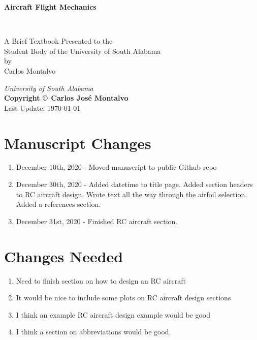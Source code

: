 \documentclass{article}
\begin{document}
\begin{center}
\begin{LARGE}{\bf Aircraft Flight Mechanics}\end{LARGE}\\
\large
\vspace{22 mm}
\begin{singlespace}
   A Brief Textbook Presented to the \\ 
   Student Body of the University of South Alabama \\
\vspace{22 mm}
   by\\
\vspace{22 mm}
  Carlos Montalvo \\
\vspace{22 mm}
\end{singlespace}
{\itshape University of South Alabama}\\
{\bf Copyright $\copyright$ Carlos Jos\'{e} Montalvo}
\\ Last Update: \today
\end{center}

\newpage

\section*{Manuscript Changes}

\begin{enumerate}[itemsep=-5pt]
\item December 10th, 2020 - Moved manuscript to public Github repo
\item December 30th, 2020 - Added datetime to title page. Added
  section headers to RC aircraft design. Wrote text all the way
  through the airfoil selection. Added a references section.
\item December 31st, 2020 - Finished RC aircraft section.
\end{enumerate}

\newpage

\section*{Changes Needed}

\begin{enumerate}[itemsep=-5pt]
\item Need to finish section on how to design an RC aircraft
\item It would be nice to include some plots on RC aircraft design
  sections
\item I think an example RC aircraft design example would be good
\item I think a section on abbreviations would be good.
\end{enumerate}
\end{document}
